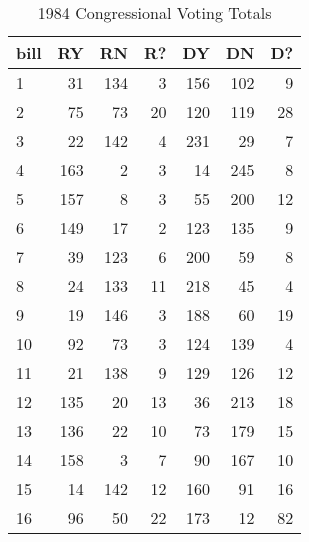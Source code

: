 \begin{table}[t]\centering\small\setlength{\tabcolsep}{2pt}\caption{1984 Congressional Voting Totals} \label{table:voting2}\begin{tabular}{l||r|r|r|r|r|r|}
bill & RY & RN & R? & DY & DN & D?\\\hline1 & 31 & 134 & 3 & 156 & 102 & 9 \\
2 & 75 & 73 & 20 & 120 & 119 & 28 \\
3 & 22 & 142 & 4 & 231 & 29 & 7 \\
4 & 163 & 2 & 3 & 14 & 245 & 8 \\
5 & 157 & 8 & 3 & 55 & 200 & 12 \\
6 & 149 & 17 & 2 & 123 & 135 & 9 \\
7 & 39 & 123 & 6 & 200 & 59 & 8 \\
8 & 24 & 133 & 11 & 218 & 45 & 4 \\
9 & 19 & 146 & 3 & 188 & 60 & 19 \\
10 & 92 & 73 & 3 & 124 & 139 & 4 \\
11 & 21 & 138 & 9 & 129 & 126 & 12 \\
12 & 135 & 20 & 13 & 36 & 213 & 18 \\
13 & 136 & 22 & 10 & 73 & 179 & 15 \\
14 & 158 & 3 & 7 & 90 & 167 & 10 \\
15 & 14 & 142 & 12 & 160 & 91 & 16 \\
16 & 96 & 50 & 22 & 173 & 12 & 82 \\
\end{tabular}\end{table}